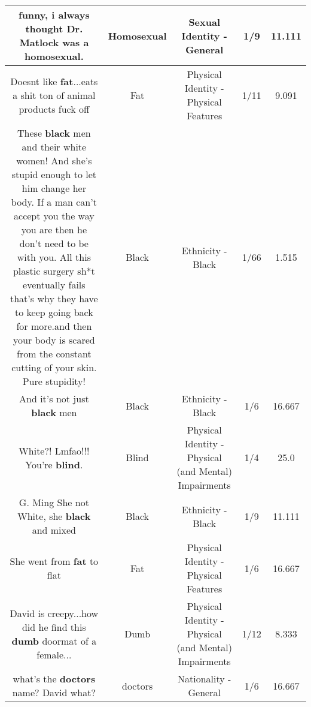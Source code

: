 \documentclass[11pt]{article}
\newlength\mylength
\begin{document}
\begin{center}
\begin{longtable}{|C{.65\mylength}|C{.30\mylength}|C{.12\mylength}|C{.12\mylength}|C{.12\mylength}|}
  \small funny, i always thought  Dr. Matlock was a \textbf{homosexual}.\normalsize   & Homosexual & Sexual Identity - General & 1/9 & 11.111 \\  \hline
  \small Doesnt like \textbf{fat}...eats a shit ton of animal products fuck off\normalsize   & Fat & Physical Identity - Physical Features & 1/11 & 9.091 \\  \hline
  \small These \textbf{black} men and their white women! And she's stupid enough to let him change her body. If a man can't accept you the way you are then he don't need to be with you. All this plastic surgery sh*t eventually fails that's why they have to keep going back for more.and then your body is scared from the constant cutting of your skin. Pure stupidity!\normalsize   & Black & Ethnicity - Black & 1/66 & 1.515 \\  \hline
  \small And it's not just \textbf{black} men\normalsize   & Black & Ethnicity - Black & 1/6 & 16.667 \\  \hline
  \small White?! Lmfao!!! You're \textbf{blind}.\normalsize   & Blind & Physical Identity - Physical (and Mental) Impairments & 1/4 & 25.0 \\  \hline
  \small G. Ming She not White, she \textbf{black} and mixed\normalsize   & Black & Ethnicity - Black & 1/9 & 11.111 \\  \hline
  \small She went from \textbf{fat} to flat\normalsize   & Fat & Physical Identity - Physical Features & 1/6 & 16.667 \\  \hline
  \small David is creepy...how did he find this \textbf{dumb} doormat of a female...\normalsize   & Dumb & Physical Identity - Physical (and Mental) Impairments & 1/12 & 8.333 \\  \hline
  \small what's the \textbf{doctors} name? David what?\normalsize   & doctors & Nationality - General & 1/6 & 16.667 \\  \hline

\end{longtable}
\end{center}
\end{document}
